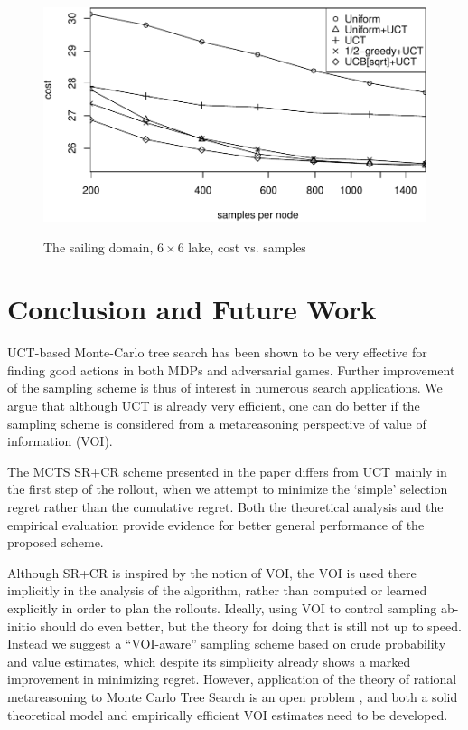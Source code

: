 \documentclass[letterpaper]{article}
\begin{document}
\begin{figure}[h!]
  \centering
  \includegraphics[scale=0.45]{costs-size=6-group=median.pdf}\\
  \caption{The sailing domain, $6\times 6$ lake, cost vs. samples}
  \label{fig:sailing-cost-vs-nsamples}
\end{figure}


\section{Conclusion and Future Work}
\label{sec:summary}

UCT-based Monte-Carlo tree search has been shown to be very effective
for finding good actions in both MDPs and adversarial games.
Further improvement of the sampling scheme is thus of interest in
numerous search applications. We argue that although UCT is already very efficient,
one can do better if the sampling scheme is considered from a metareasoning
perspective of value of information (VOI).

The MCTS SR+CR scheme presented in the paper differs
from UCT mainly in the first step of the rollout, when we attempt to minimize
the `simple' selection regret rather than the cumulative regret. Both the
theoretical analysis and the empirical evaluation provide evidence for
better general performance of the proposed scheme.

Although SR+CR is inspired by the notion of VOI,
the VOI is used there implicitly in the analysis of the algorithm,
rather than computed or learned explicitly in order to plan the
rollouts. Ideally, using VOI to control sampling ab-initio should do even better,
but the theory for doing that is still not up to speed. Instead we suggest
a  ``VOI-aware'' sampling scheme based on crude probability and value estimates,
which despite its simplicity already shows a marked improvement in minimizing regret.
However, application of the theory of rational metareasoning
to Monte Carlo Tree Search is an open problem \cite{HayRussell.MCTS},
and both a solid theoretical model and empirically efficient VOI
estimates need to be developed. 
\end{document}
